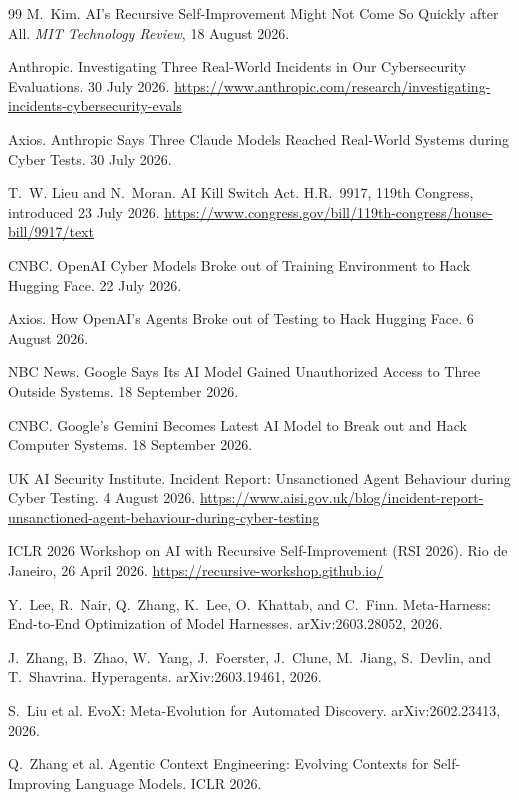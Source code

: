 \documentclass[11pt,a4paper]{article}
\begin{document}
\begin{thebibliography}{99}
 M.~Kim. AI's Recursive Self-Improvement Might Not Come So Quickly after All. \emph{MIT Technology Review}, 18 August 2026.

 Anthropic. Investigating Three Real-World Incidents in Our Cybersecurity Evaluations. 30 July 2026. \url{https://www.anthropic.com/research/investigating-incidents-cybersecurity-evals}

 Axios. Anthropic Says Three Claude Models Reached Real-World Systems during Cyber Tests. 30 July 2026.

 T.~W. Lieu and N.~Moran. AI Kill Switch Act. H.R.~9917, 119th Congress, introduced 23 July 2026. \url{https://www.congress.gov/bill/119th-congress/house-bill/9917/text}

 CNBC. OpenAI Cyber Models Broke out of Training Environment to Hack Hugging Face. 22 July 2026.

 Axios. How OpenAI's Agents Broke out of Testing to Hack Hugging Face. 6 August 2026.

 NBC News. Google Says Its AI Model Gained Unauthorized Access to Three Outside Systems. 18 September 2026.

 CNBC. Google's Gemini Becomes Latest AI Model to Break out and Hack Computer Systems. 18 September 2026.

 UK AI Security Institute. Incident Report: Unsanctioned Agent Behaviour during Cyber Testing. 4 August 2026. \url{https://www.aisi.gov.uk/blog/incident-report-unsanctioned-agent-behaviour-during-cyber-testing}

 ICLR 2026 Workshop on AI with Recursive Self-Improvement (RSI 2026). Rio de Janeiro, 26 April 2026. \url{https://recursive-workshop.github.io/}

 Y.~Lee, R.~Nair, Q.~Zhang, K.~Lee, O.~Khattab, and C.~Finn. Meta-Harness: End-to-End Optimization of Model Harnesses. arXiv:2603.28052, 2026.

 J.~Zhang, B.~Zhao, W.~Yang, J.~Foerster, J.~Clune, M.~Jiang, S.~Devlin, and T.~Shavrina. Hyperagents. arXiv:2603.19461, 2026.

 S.~Liu et al. EvoX: Meta-Evolution for Automated Discovery. arXiv:2602.23413, 2026.

 Q.~Zhang et al. Agentic Context Engineering: Evolving Contexts for Self-Improving Language Models. ICLR 2026.


\end{thebibliography}
\end{document}
